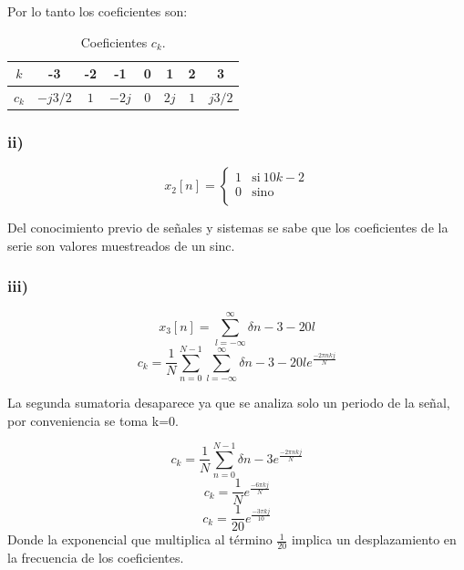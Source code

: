 \documentclass{article}
\begin{document}
Por lo tanto los coeficientes son:
\begin{table}[H]
    \centering
    \begin{tabular}{|c|c|c|c|c|c|c|c|}
        \hline
        $k$ & -3 & -2 & -1 & 0 & 1 & 2 & 3  \\ \hline
        $c_k$ & $-j3/2$ & $1$ & $-2j$ & 0 & $2j$ & $1$ & $j3/2$ \\ \hline
        \end{tabular}
    \caption{Coeficientes $c_k$.}
    \label{}
\end{table}

\subsubsection*{ii)}
\begin{equation} 
    x_{2}[n] = \left\{ 
    \begin{array}{ll} 
    1 & \mathrm{si\ } 10 k - 2\\
    0 & \mathrm{sino\ } \\
    \end{array} 
    \right.
\end{equation}
 
Del conocimiento previo de señales y sistemas se sabe que los coeficientes de la serie son valores muestreados de un sinc.

\subsubsection*{iii)}

\begin{equation} 
    x_{3}[n]=\sum_{l=-\infty}^{\infty}\delta{n-3-20 l} 
\end{equation}
\begin{equation} 
    c_{k}=\frac{1}{N} \sum_{n=0}^{N-1}\sum_{l=-\infty}^{\infty} \delta{n-3-20 l}  e^{\frac{-2 \pi n k j }{N}}
\end{equation}

La segunda sumatoria desaparece ya que se analiza solo un periodo de la señal, por conveniencia se toma k=0.

\begin{equation} 
    c_{k}=\frac{1}{N} \sum_{n=0}^{N-1}\delta{n-3}  e^{\frac{-2 \pi n k j }{N}}
\end{equation}
\begin{equation} 
    c_{k}=\frac{1}{N}  e^{\frac{-6 \pi  k j }{N}}
\end{equation}
\begin{equation} 
    c_{k}=\frac{1}{20}  e^{\frac{-3 \pi  k j }{10}}
\end{equation}
Donde la exponencial que multiplica al término $\frac{1}{20}$ implica un desplazamiento en la frecuencia de los coeficientes.
\end{document}

